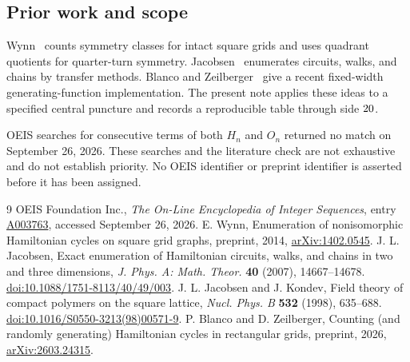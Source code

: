 \documentclass[12pt]{amsart}
\begin{document}
\subsection{Prior work and scope}
Wynn~\cite{wynn} counts symmetry classes for intact square grids and uses
quadrant quotients for quarter-turn symmetry. Jacobsen~\cite{jacobsen}
enumerates circuits, walks, and chains by transfer methods.
Blanco and Zeilberger~\cite{blanco} give a recent fixed-width
generating-function implementation. The present note applies these ideas
to a specified central puncture and records a reproducible table through
side $20$.

OEIS searches for consecutive terms of both $H_n$ and $O_n$ returned no
match on September 26, 2026. These searches and the literature check are
not exhaustive and do not establish priority. No OEIS identifier or
preprint identifier is asserted before it has been assigned.

\begin{thebibliography}{9}
OEIS Foundation Inc., \emph{The On-Line Encyclopedia of Integer Sequences},
entry \href{https://oeis.org/A003763}{A003763}, accessed September 26, 2026.
E. Wynn, Enumeration of nonisomorphic Hamiltonian cycles on square grid
graphs, preprint, 2014, \href{https://arxiv.org/abs/1402.0545}{arXiv:1402.0545}.
J. L. Jacobsen, Exact enumeration of Hamiltonian circuits, walks, and chains
in two and three dimensions, \emph{J. Phys. A: Math. Theor.}
\textbf{40} (2007), 14667--14678.
\href{https://doi.org/10.1088/1751-8113/40/49/003}{doi:10.1088/1751-8113/40/49/003}.
J. L. Jacobsen and J. Kondev, Field theory of compact polymers on the
square lattice, \emph{Nucl. Phys. B} \textbf{532} (1998), 635--688.
\href{https://doi.org/10.1016/S0550-3213(98)00571-9}{doi:10.1016/S0550-3213(98)00571-9}.
P. Blanco and D. Zeilberger, Counting (and randomly generating) Hamiltonian
cycles in rectangular grids, preprint, 2026,
\href{https://arxiv.org/abs/2603.24315}{arXiv:2603.24315}.
\end{thebibliography}
\end{document}
